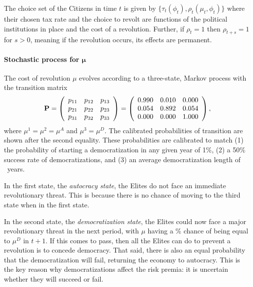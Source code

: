 \documentclass[12pt]{article}
\numberwithin{equation}{section}
\begin{document}
The choice set of the Citizens in time $t$ is given by $\{\tau_t (\phi_t) ,\rho_t (\mu_t, \phi_t)\}$ where their chosen tax rate and the choice to revolt are functions of the political institutions in place and the cost of a revolution. Further, if $\rho_t = 1$ then $\rho_{t+s} = 1$ for $s>0$, meaning if the revolution occurs, its effects are permanent.

\paragraph{Stochastic process for $\boldsymbol \mu$}

The cost of revolution $\mu$ evolves according to a three-state, Markov process with the transition matrix 
\begin{equation}
\mathbf{P}=\left(\begin{array}{lll}
p_{11} & p_{12} & p_{13}\\
p_{21} & p_{22} & p_{23}\\
p_{31} & p_{32} & p_{33}
\end{array}\right)=\left(\begin{array}{lll}
0.990 & 0.010 & 0.000\\
0.054 & 0.892 & 0.054 \\
0.000 & 0.000 & 1.000
\end{array}\right),
\label{eq:transmat}
\end{equation}
where $\mu^{1}=\mu^{2}=\mu^A$ and $\mu^{3}=\mu^{D}$. The calibrated probabilities of transition are shown after the second equality. These probabilities are calibrated to match (1) the probability of starting a democratization in any given year of 1\%, (2) a 50\% success rate of democratizations, and (3) an average democratization length of \demEpisodeLength\ years.  

In the first state, the \textit{autocracy state},  the Elites do not face an immediate revolutionary threat. This is because there is no chance of moving to the third state when in the first state.

In the second state, the \textit{democratization state},  the Elites could now face a major revolutionary threat in the next period, with $\mu$ having a \transPTwoThreePct\% chance of being equal to $\mu^{D}$ in $t+1$. If this comes to pass, then all the Elites can do to prevent a revolution is to concede democracy. That said, there is also an equal probability that the democratization will fail, returning the economy to autocracy.  This is the key reason why democratizations affect the risk premia: it is uncertain whether they will succeed or fail.
\end{document}
